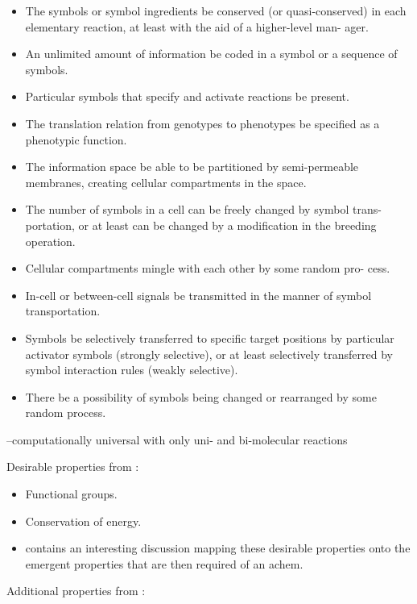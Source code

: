 \begin{itemize}
	\item
 The symbols or symbol ingredients be conserved (or quasi-conserved) in
 each elementary reaction, at least with the aid of a higher-level man-
 ager.
	\item
 An unlimited amount of information be coded in a symbol or a sequence
 of symbols.
	\item
 Particular symbols that specify and activate reactions be present.
	\item
 The translation relation from genotypes to phenotypes be specified as
 a phenotypic function.
	\item
 The information space be able to be partitioned by semi-permeable
 membranes, creating cellular compartments in the space.
	\item
 The number of symbols in a cell can be freely changed by symbol trans-
 portation, or at least can be changed by a modification in the
 breeding operation.
	\item
 Cellular compartments mingle with each other by some random pro- cess.
	\item
 In-cell or between-cell signals be transmitted in the manner of symbol
 transportation.
	\item
 Symbols be selectively transferred to specific target positions by
 particular activator symbols (strongly selective), or at least
 selectively transferred by symbol interaction rules (weakly
 selective).
	\item
 There be a possibility of symbols being changed or rearranged by some
 random process.
\end{itemize}

\autocite{Tominaga2007}--computationally universal with only uni- and
bi-molecular reactions

Desirable properties from \autocite{Faulconbridge2011}:

\begin{itemize}
	\item
 Functional groups.
	\item
 Conservation of energy.
	\item
 \autocite[sec.4.4]{Faulconbridge2011} contains an interesting
 discussion mapping these desirable properties onto the emergent
 properties that are then required of an \gls{achem}.
\end{itemize}

Additional properties from \autocite{Hickinbotham2010}:

